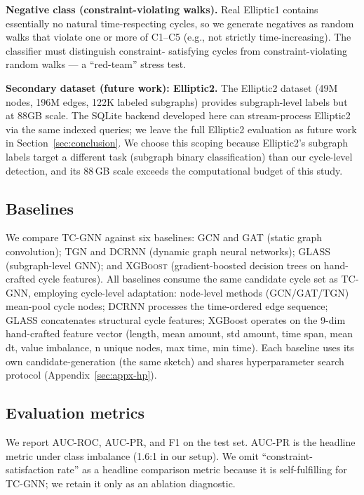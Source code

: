 \documentclass[journal,onecolumn]{IEEEtran}
\begin{document}
\textbf{Negative class (constraint-violating walks).} Real Elliptic1
contains essentially no natural time-respecting cycles, so we generate
negatives as random walks that violate one or more of C1--C5 (e.g., not
strictly time-increasing). The classifier must distinguish constraint-
satisfying cycles from constraint-violating random walks --- a
``red-team'' stress test.

\textbf{Secondary dataset (future work): Elliptic2.} The Elliptic2 dataset
(49M nodes, 196M edges, 122K labeled subgraphs) provides subgraph-level
labels but at $88$GB scale. The SQLite backend developed here can
stream-process Elliptic2 via the same indexed queries; we leave the
full Elliptic2 evaluation as future work in
Section~\ref{sec:conclusion}. We choose this scoping because Elliptic2's
subgraph labels target a different task (subgraph binary classification)
than our cycle-level detection, and its 88\,GB scale exceeds the
computational budget of this study.

\subsection{Baselines}
\label{sec:exp-baselines}

We compare TC-GNN against six baselines: \textsc{GCN} and \textsc{GAT}
(static graph convolution); \textsc{TGN} and \textsc{DCRNN} (dynamic
graph neural networks); \textsc{GLASS} (subgraph-level GNN); and
\textsc{XGBoost} (gradient-boosted decision trees on hand-crafted cycle
features). All baselines consume the same candidate cycle set as TC-GNN,
employing cycle-level adaptation: node-level methods (GCN/GAT/TGN) mean-pool
cycle nodes; DCRNN processes the time-ordered edge sequence; GLASS
concatenates structural cycle features; XGBoost operates on the 9-dim
hand-crafted feature vector (length, mean amount, std amount, time span,
mean dt, value imbalance, n unique nodes, max time, min time). Each
baseline uses its own candidate-generation (the same sketch) and shares
hyperparameter search protocol (Appendix~\ref{sec:appx-hp}).

\subsection{Evaluation metrics}
\label{sec:exp-metrics}

We report AUC-ROC, AUC-PR, and F1 on the test set. AUC-PR is the
headline metric under class imbalance (1.6:1 in our setup). We omit
``constraint-satisfaction rate'' as a headline comparison metric because
it is self-fulfilling for TC-GNN; we retain it only as an ablation
diagnostic.
\end{document}
